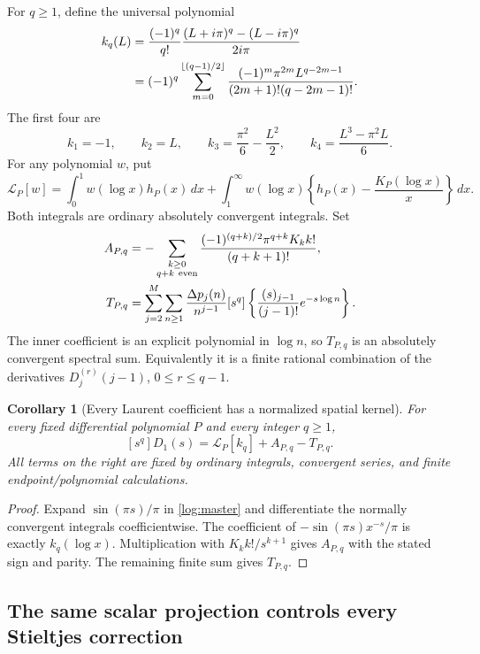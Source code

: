 \documentclass[11pt,letterpaper]{article}
\numberwithin{equation}{section}
\theoremstyle{plain}
\newtheorem{corollary}[theorem]{Corollary}
\theoremstyle{definition}
\theoremstyle{remark}
\begin{document}
For $q\ge1$, define the universal polynomial
\begin{align}\label{log:kernel}
 k_q(L)&=\frac{(-1)^q}{q!}
          \frac{(L+i\pi)^q-(L-i\pi)^q}{2i\pi}\notag\\
 &=(-1)^q\sum_{m=0}^{\lfloor(q-1)/2\rfloor}
       \frac{(-1)^m\pi^{2m}L^{q-2m-1}}
            {(2m+1)!(q-2m-1)!}.
\end{align}
The first four are
\[
 k_1=-1,\qquad k_2=L,\qquad
 k_3=\frac{\pi^2}{6}-\frac{L^2}{2},\qquad
 k_4=\frac{L^3-\pi^2L}{6}.
\]
For any polynomial $w$, put
\[
 \mathcal L_P[w]=\int_0^1w(\log x)h_P(x)\,dx+
 \int_1^\infty w(\log x)
       \left\{h_P(x)-\frac{K_P(\log x)}x\right\}\,dx.
\]
Both integrals are ordinary absolutely convergent integrals.
Set
\begin{align}\label{log:constants}
 A_{P,q}&=-\sum_{\substack{k\ge0\\q+k\ \mathrm{even}}}
        \frac{(-1)^{(q+k)/2}\pi^{q+k}K_k k!}{(q+k+1)!},\notag\\
 T_{P,q}&=\sum_{j=2}^M\sum_{n\ge1}
       \frac{\Delta p_j(n)}{n^{j-1}}
       [s^q]\left\{\frac{(s)_{j-1}}{(j-1)!}e^{-s\log n}\right\}.
\end{align}
The inner coefficient is an explicit polynomial in $\log n$, so
$T_{P,q}$ is an absolutely convergent spectral sum. Equivalently it
is a finite rational combination of the derivatives
$D_j^{(r)}(j-1)$, $0\le r\le q-1$.

\begin{corollary}[Every Laurent coefficient has a normalized spatial kernel]
\label{log:coefficient}
For every fixed differential polynomial $P$ and every integer $q\ge1$,
\begin{equation}\label{log:coefficient-formula}
 \boxed{[s^q]D_1(s)=\mathcal L_P[k_q]+A_{P,q}-T_{P,q}.}
\end{equation}
All terms on the right are fixed by ordinary integrals, convergent
series, and finite endpoint/polynomial calculations.
\end{corollary}
\begin{proof}
Expand $\sin(\pi s)/\pi$ in \eqref{log:master} and differentiate
the normally convergent integrals coefficientwise. The coefficient
of $-\sin(\pi s)x^{-s}/\pi$ is exactly $k_q(\log x)$.
Multiplication with $K_k k!/s^{k+1}$ gives $A_{P,q}$ with the
stated sign and parity. The remaining finite sum gives $T_{P,q}$.
\end{proof}

\subsection{The same scalar projection controls every Stieltjes correction}
\end{document}

